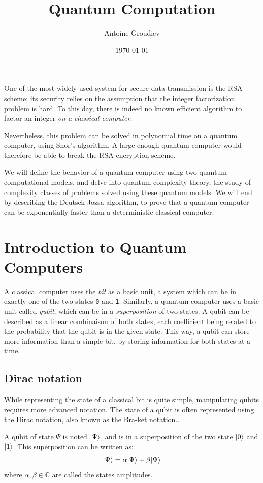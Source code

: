 \documentclass[12pt,a4paper]{article}
\title{\vspace{-5ex} \textbf{Quantum Computation}}
\author{Antoine Groudiev}
\date{\vspace{-1ex}\today}
\theoremstyle{plain}
\theoremstyle{definition}
\DeclarePairedDelimiter\ket{\lvert}{\rangle}
\begin{document}
\maketitle
One of the most widely used system for secure data transmission is the RSA scheme; its security relies on the assumption that the integer factorization problem is hard. To this day, there is indeed no known efficient algorithm to factor an integer \textit{on a classical computer}.

Nevertheless, this problem can be solved in polynomial time on a quantum computer, using Shor's algorithm. A large enough quantum computer would therefore be able to break the RSA encryption scheme.

We will define the behavior of a quantum computer using two quantum computational models, and delve into quantum complexity theory, the study of complexity classes of problems solved using these quantum models. We will end by describing the Deutsch-Jozsa algorithm, to prove that a quantum computer can be exponentially faster than a deterministic classical computer.

\tableofcontents

\section{Introduction to Quantum Computers}
A classical computer uses the \emph{bit} as a basic unit, a system which can be in exactly one of the two states \texttt{0} and \texttt{1}. Similarly, a quantum computer uses a basic unit called \emph{qubit}, which can be in a \emph{superposition} of two states. A qubit can be described as a linear combinaison of both states, each coefficient being related to the probability that the qubit is in the given state. This way, a qubit can store more information than a simple bit, by storing information for both states at a time.

\subsection{Dirac notation}
While representing the state of a classical bit is quite simple, manipulating qubits requires more advanced notation. 
The state of a qubit is often represented using the Dirac notation, also known as the Bra-ket notation.\cite{dirac-notation}.

A qubit of state $\Psi$ is noted $\ket{\Psi}$, and is in a superposition of the two state $\ket{0}$ and $\ket{1}$. This superposition can be written as:
\begin{equation*}
    \ket{\Psi}=\alpha\ket{\Psi}+\beta\ket{\Psi}
\end{equation*}
where $\alpha, \beta\in \mathbb{C}$ are called the states amplitudes. 
\end{document}
